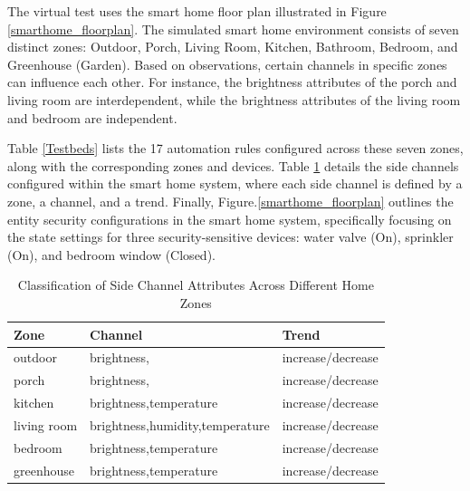 The virtual test uses the smart home floor plan illustrated in Figure \ref{smarthome_floorplan}. The simulated smart home environment consists of seven distinct zones: Outdoor, Porch, Living Room, Kitchen, Bathroom, Bedroom, and Greenhouse (Garden).  Based on observations, certain channels in specific zones can influence each other. For instance, the brightness attributes of the porch and living room are interdependent, while the brightness attributes of the living room and bedroom are independent.

Table \ref{Testbeds} lists the 17 automation rules configured across these seven zones, along with the corresponding zones and devices. Table \ref{side_channel} details the side channels configured within the smart home system, where each side channel is defined by a zone, a channel, and a trend. Finally, Figure.\ref{smarthome_floorplan} outlines the entity security configurations in the smart home system, specifically focusing on the state settings for three security-sensitive devices: water valve (On), sprinkler (On), and bedroom window (Closed).

\begin{table}[htbp]
	\caption{Classification of Side Channel Attributes Across Different Home Zones}
	\label{side_channel}
	\begin{tabular}[width=0.45\textwidth]{l|l|l}
		\hline
		\textbf{Zone} & \textbf{Channel} & \textbf{Trend} \\
		\hline
		outdoor& brightness, & increase/decrease \\
		\hline
		porch& brightness, & increase/decrease \\
		\hline
		kitchen& brightness,temperature & increase/decrease \\
		\hline
		living room & brightness,humidity,temperature & increase/decrease \\
		\hline
		bedroom & brightness,temperature & increase/decrease \\
		\hline
		greenhouse & brightness,temperature & increase/decrease \\
		\hline
	\end{tabular}
\end{table}


